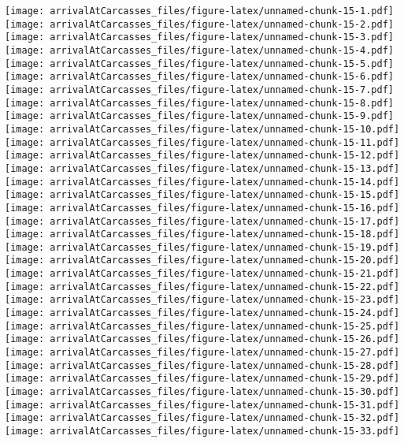 \documentclass[
]{article}
\begin{document}
\texttt{[image: arrivalAtCarcasses\_files/figure-latex/unnamed-chunk-15-1.pdf]}
\texttt{[image: arrivalAtCarcasses\_files/figure-latex/unnamed-chunk-15-2.pdf]}
\texttt{[image: arrivalAtCarcasses\_files/figure-latex/unnamed-chunk-15-3.pdf]}
\texttt{[image: arrivalAtCarcasses\_files/figure-latex/unnamed-chunk-15-4.pdf]}
\texttt{[image: arrivalAtCarcasses\_files/figure-latex/unnamed-chunk-15-5.pdf]}
\texttt{[image: arrivalAtCarcasses\_files/figure-latex/unnamed-chunk-15-6.pdf]}
\texttt{[image: arrivalAtCarcasses\_files/figure-latex/unnamed-chunk-15-7.pdf]}
\texttt{[image: arrivalAtCarcasses\_files/figure-latex/unnamed-chunk-15-8.pdf]}
\texttt{[image: arrivalAtCarcasses\_files/figure-latex/unnamed-chunk-15-9.pdf]}
\texttt{[image: arrivalAtCarcasses\_files/figure-latex/unnamed-chunk-15-10.pdf]}
\texttt{[image: arrivalAtCarcasses\_files/figure-latex/unnamed-chunk-15-11.pdf]}
\texttt{[image: arrivalAtCarcasses\_files/figure-latex/unnamed-chunk-15-12.pdf]}
\texttt{[image: arrivalAtCarcasses\_files/figure-latex/unnamed-chunk-15-13.pdf]}
\texttt{[image: arrivalAtCarcasses\_files/figure-latex/unnamed-chunk-15-14.pdf]}
\texttt{[image: arrivalAtCarcasses\_files/figure-latex/unnamed-chunk-15-15.pdf]}
\texttt{[image: arrivalAtCarcasses\_files/figure-latex/unnamed-chunk-15-16.pdf]}
\texttt{[image: arrivalAtCarcasses\_files/figure-latex/unnamed-chunk-15-17.pdf]}
\texttt{[image: arrivalAtCarcasses\_files/figure-latex/unnamed-chunk-15-18.pdf]}
\texttt{[image: arrivalAtCarcasses\_files/figure-latex/unnamed-chunk-15-19.pdf]}
\texttt{[image: arrivalAtCarcasses\_files/figure-latex/unnamed-chunk-15-20.pdf]}
\texttt{[image: arrivalAtCarcasses\_files/figure-latex/unnamed-chunk-15-21.pdf]}
\texttt{[image: arrivalAtCarcasses\_files/figure-latex/unnamed-chunk-15-22.pdf]}
\texttt{[image: arrivalAtCarcasses\_files/figure-latex/unnamed-chunk-15-23.pdf]}
\texttt{[image: arrivalAtCarcasses\_files/figure-latex/unnamed-chunk-15-24.pdf]}
\texttt{[image: arrivalAtCarcasses\_files/figure-latex/unnamed-chunk-15-25.pdf]}
\texttt{[image: arrivalAtCarcasses\_files/figure-latex/unnamed-chunk-15-26.pdf]}
\texttt{[image: arrivalAtCarcasses\_files/figure-latex/unnamed-chunk-15-27.pdf]}
\texttt{[image: arrivalAtCarcasses\_files/figure-latex/unnamed-chunk-15-28.pdf]}
\texttt{[image: arrivalAtCarcasses\_files/figure-latex/unnamed-chunk-15-29.pdf]}
\texttt{[image: arrivalAtCarcasses\_files/figure-latex/unnamed-chunk-15-30.pdf]}
\texttt{[image: arrivalAtCarcasses\_files/figure-latex/unnamed-chunk-15-31.pdf]}
\texttt{[image: arrivalAtCarcasses\_files/figure-latex/unnamed-chunk-15-32.pdf]}
\texttt{[image: arrivalAtCarcasses\_files/figure-latex/unnamed-chunk-15-33.pdf]}
\end{document}
